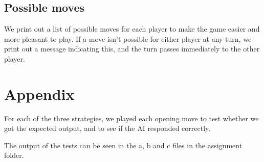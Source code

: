 \documentclass[12pt]{article}
\begin{document}
\subsection{Possible moves}
We print out a list of possible moves for each player to make the game easier and more pleasant to play.
If a move isn't possible for either player at any turn, we print out a message indicating this, and the
turn passes immediately to the other player.

\section{Appendix}
For each of the three strategies, we played each opening move to test whether we got the expected output,
and to see if the AI responded correctly.

The output of the tests can be seen in the a, b and c files in the assignment folder.



\end{document}
